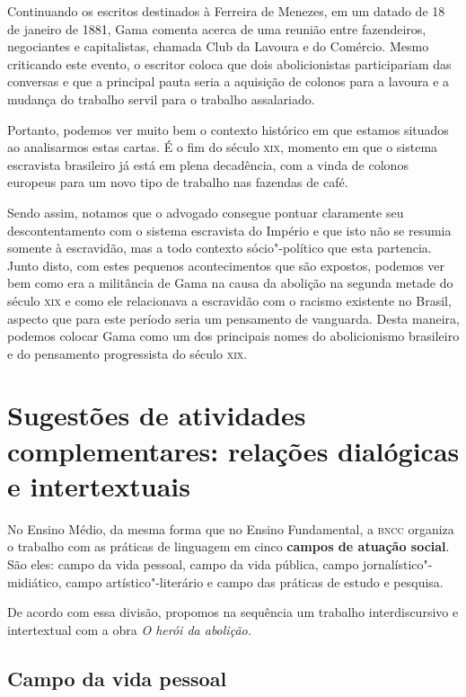 \documentclass[12pt]{extarticle}
\begin{document}
Continuando os escritos destinados à Ferreira de Menezes, em um datado
de 18 de janeiro de 1881, Gama comenta acerca de uma reunião entre
fazendeiros, negociantes e capitalistas, chamada Club da Lavoura e do
Comércio. Mesmo criticando este evento, o escritor coloca que dois
abolicionistas participariam das conversas e que a principal pauta seria
a aquisição de colonos para a lavoura e a mudança do trabalho servil
para o trabalho assalariado.

Portanto, podemos ver muito bem o contexto histórico em que estamos
situados ao analisarmos estas cartas. É o fim do século \textsc{xix}, momento em
que o sistema escravista brasileiro já está em plena decadência, com a
vinda de colonos europeus para um novo tipo de trabalho nas fazendas de
café.

Sendo assim, notamos que o advogado consegue pontuar claramente seu
descontentamento com o sistema escravista do Império e que isto não se
resumia somente à escravidão, mas a todo contexto sócio"-político que
esta partencia. Junto disto, com estes pequenos acontecimentos que são
expostos, podemos ver bem como era a militância de Gama na causa da
abolição na segunda metade do século \textsc{xix} e como ele relacionava a
escravidão com o racismo existente no Brasil, aspecto que para este
período seria um pensamento de vanguarda. Desta maneira, podemos colocar
Gama como um dos principais nomes do abolicionismo brasileiro e do
pensamento progressista do século \textsc{xix}.

\section{Sugestões de atividades complementares: relações dialógicas e
intertextuais}


No Ensino Médio, da mesma forma que no Ensino Fundamental, a \textsc{bncc}
organiza o trabalho com as práticas de linguagem em cinco \textbf{campos
de atuação social}. São eles: campo da vida pessoal, campo da vida
pública, campo jornalístico"-midiático, campo artístico"-literário e campo
das práticas de estudo e pesquisa.

De acordo com essa divisão, propomos na sequência um trabalho
interdiscursivo e intertextual com a obra \emph{O herói da abolição.}


\subsection{Campo da vida pessoal}
\end{document}
